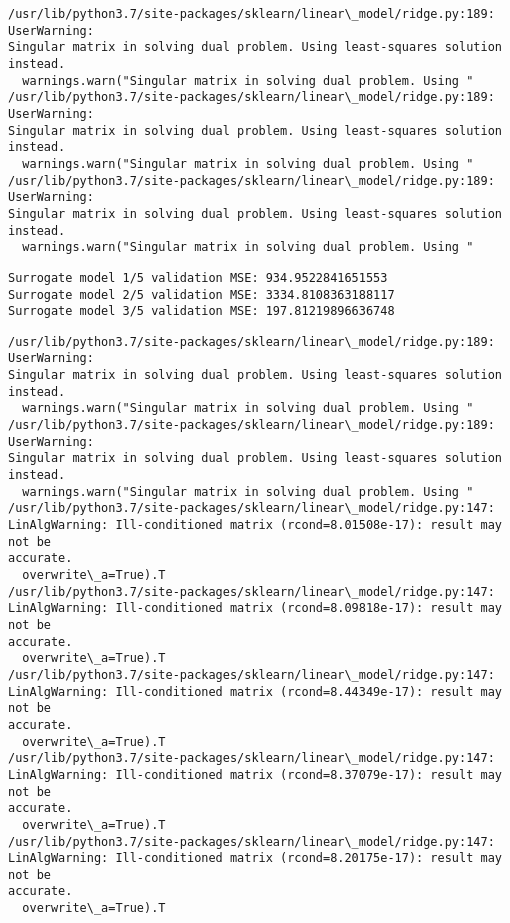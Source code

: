 \documentclass[11pt]{article}
\begin{document}
    \begin{Verbatim}[commandchars=\\\{\}]
/usr/lib/python3.7/site-packages/sklearn/linear\_model/ridge.py:189: UserWarning:
Singular matrix in solving dual problem. Using least-squares solution instead.
  warnings.warn("Singular matrix in solving dual problem. Using "
/usr/lib/python3.7/site-packages/sklearn/linear\_model/ridge.py:189: UserWarning:
Singular matrix in solving dual problem. Using least-squares solution instead.
  warnings.warn("Singular matrix in solving dual problem. Using "
/usr/lib/python3.7/site-packages/sklearn/linear\_model/ridge.py:189: UserWarning:
Singular matrix in solving dual problem. Using least-squares solution instead.
  warnings.warn("Singular matrix in solving dual problem. Using "
    \end{Verbatim}

    \begin{Verbatim}[commandchars=\\\{\}]
Surrogate model 1/5 validation MSE: 934.9522841651553
Surrogate model 2/5 validation MSE: 3334.8108363188117
Surrogate model 3/5 validation MSE: 197.81219896636748
    \end{Verbatim}

    \begin{Verbatim}[commandchars=\\\{\}]
/usr/lib/python3.7/site-packages/sklearn/linear\_model/ridge.py:189: UserWarning:
Singular matrix in solving dual problem. Using least-squares solution instead.
  warnings.warn("Singular matrix in solving dual problem. Using "
/usr/lib/python3.7/site-packages/sklearn/linear\_model/ridge.py:189: UserWarning:
Singular matrix in solving dual problem. Using least-squares solution instead.
  warnings.warn("Singular matrix in solving dual problem. Using "
/usr/lib/python3.7/site-packages/sklearn/linear\_model/ridge.py:147:
LinAlgWarning: Ill-conditioned matrix (rcond=8.01508e-17): result may not be
accurate.
  overwrite\_a=True).T
/usr/lib/python3.7/site-packages/sklearn/linear\_model/ridge.py:147:
LinAlgWarning: Ill-conditioned matrix (rcond=8.09818e-17): result may not be
accurate.
  overwrite\_a=True).T
/usr/lib/python3.7/site-packages/sklearn/linear\_model/ridge.py:147:
LinAlgWarning: Ill-conditioned matrix (rcond=8.44349e-17): result may not be
accurate.
  overwrite\_a=True).T
/usr/lib/python3.7/site-packages/sklearn/linear\_model/ridge.py:147:
LinAlgWarning: Ill-conditioned matrix (rcond=8.37079e-17): result may not be
accurate.
  overwrite\_a=True).T
/usr/lib/python3.7/site-packages/sklearn/linear\_model/ridge.py:147:
LinAlgWarning: Ill-conditioned matrix (rcond=8.20175e-17): result may not be
accurate.
  overwrite\_a=True).T
    \end{Verbatim}
\end{document}
